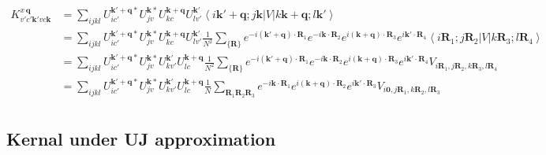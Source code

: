 \documentclass{report}
\begin{document}
\begin{equation}
  \begin{aligned}
    K_{v'c'\boldsymbol{k}'vc\boldsymbol{k}}^{x\,\boldsymbol{q}} 
      &= \sum_{ijkl} U_{ic'}^{\boldsymbol{k}'+\boldsymbol{q}*} U_{jv}^{\boldsymbol{k}*} 
        U_{kc}^{\boldsymbol{k}+\boldsymbol{q}} U_{lv'}^{\boldsymbol{k}'} 
        \left\langle i\boldsymbol{k}'+\boldsymbol{q};j\boldsymbol{k} \left| V \right| k\boldsymbol{k}+\boldsymbol{q};l\boldsymbol{k}' \right\rangle \\
      &= \sum_{ijkl} U_{ic'}^{\boldsymbol{k}'+\boldsymbol{q}*} U_{jv}^{\boldsymbol{k}*} 
        U_{kc}^{\boldsymbol{k}+\boldsymbol{q}} U_{lv'}^{\boldsymbol{k}'} 
        \frac{1}{N^2} \sum_{\{\boldsymbol{R}\}} 
        e^{-i(\boldsymbol{k}'+\boldsymbol{q}) \cdot \boldsymbol{R}_1} 
        e^{-i\boldsymbol{k} \cdot \boldsymbol{R}_2} 
        e^{i(\boldsymbol{k}+\boldsymbol{q}) \cdot \boldsymbol{R}_3} 
        e^{i\boldsymbol{k}' \cdot \boldsymbol{R}_4} 
        \left\langle i\boldsymbol{R}_1;j\boldsymbol{R}_2 \left| V \right| k\boldsymbol{R}_3;l\boldsymbol{R}_4 \right\rangle \\
      &= \sum_{ijkl} U_{ic'}^{\boldsymbol{k}'+\boldsymbol{q}*} U_{jv}^{\boldsymbol{k}*} U_{kv'}^{\boldsymbol{k}'} U_{lc}^{\boldsymbol{k}+\boldsymbol{q}} 
        \frac{1}{N^2} \sum_{\{\boldsymbol{R}\}} 
        e^{-i(\boldsymbol{k}'+\boldsymbol{q}) \cdot \boldsymbol{R}_1} 
        e^{-i\boldsymbol{k} \cdot \boldsymbol{R}_2} 
        e^{i(\boldsymbol{k}+\boldsymbol{q}) \cdot \boldsymbol{R}_3} 
        e^{i\boldsymbol{k}' \cdot \boldsymbol{R}_4} 
        V_{i\boldsymbol{R}_1,j\boldsymbol{R}_2,k\boldsymbol{R}_3,l\boldsymbol{R}_4} \\
      &= \sum_{ijkl} U_{ic'}^{\boldsymbol{k}'+\boldsymbol{q}*} U_{jv}^{\boldsymbol{k}*} U_{kv'}^{\boldsymbol{k}'} U_{lc}^{\boldsymbol{k}+\boldsymbol{q}} 
        \frac{1}{N} \sum_{\boldsymbol{R}_1\boldsymbol{R}_2\boldsymbol{R}_3} 
        e^{-i\boldsymbol{k} \cdot \boldsymbol{R}_1} 
        e^{i(\boldsymbol{k}+\boldsymbol{q}) \cdot \boldsymbol{R}_2}
        e^{i\boldsymbol{k}' \cdot \boldsymbol{R}_3} 
        V_{i\boldsymbol{0},j\boldsymbol{R}_1,k\boldsymbol{R}_2,l\boldsymbol{R}_3} \\
  \end{aligned}
\end{equation}

\subsection{Kernal under UJ approximation}
\end{document}
